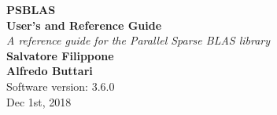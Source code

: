 \documentclass[10pt,a4paper,twoside]{article}
\begin{document}
\lstset{language=Fortran}

{\LARGE\bfseries PSBLAS\\[.8ex] User's and Reference
  Guide}\\[\baselineskip]
\emph{\large A reference guide for the Parallel Sparse BLAS library}\\[3ex]
{\bfseries Salvatore Filippone\\
   Alfredo Buttari } \\
Software version: 3.6.0\\
Dec 1st, 2018
\cleardoublepage
\begingroup
  \renewcommand*{\thepage}{toc}
  \setcounter{page}{1}    %
  \tableofcontents
\endgroup  

\cleardoublepage

\setcounter{page}{1}    %












\cleardoublepage


\end{document}
